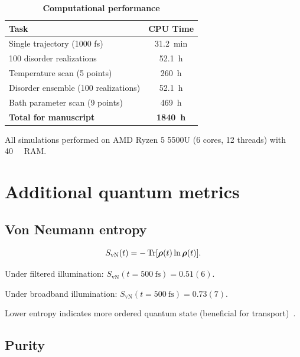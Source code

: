 \documentclass[11pt,a4paper]{article}
\begin{document}
\begin{table}[h]
\centering
\caption{\textbf{Computational performance}}
\label{tab:SI_performance}
\begin{tabular}{lc}
\toprule
\textbf{Task} & \textbf{CPU Time} \\
\midrule
Single trajectory (1000 fs) & \SI{31.2}{\minute} \\
100 disorder realizations & \SI{52.1}{\hour} \\
Temperature scan (5 points) & \SI{260}{\hour} \\
Disorder ensemble (100 realizations) & \SI{52.1}{\hour} \\
Bath parameter scan (9 points) & \SI{469}{\hour} \\
\midrule
\textbf{Total for manuscript} & \textbf{\SI{1840}{\hour}} \\
\bottomrule
\end{tabular}
\end{table}

All simulations performed on AMD Ryzen 5 5500U (6 cores, 12 threads) with \SI{40}{\giga\byte} RAM.


\section{Additional quantum metrics}

\subsection{Von Neumann entropy}

\begin{equation}
S_{\mathrm{vN}}(t) = -\Tr[\vb*{\rho}(t)\ln\vb*{\rho}(t)].
\label{eq:SI_von_neumann}
\end{equation}

Under filtered illumination: $S_{\mathrm{vN}}(t=\SI{500}{\femto\second}) = 0.51(6)$.

Under broadband illumination: $S_{\mathrm{vN}}(t=\SI{500}{\femto\second}) = 0.73(7)$.

Lower entropy indicates more ordered quantum state (beneficial for transport)~\cite{Cao2020}.

\subsection{Purity}
\end{document}
